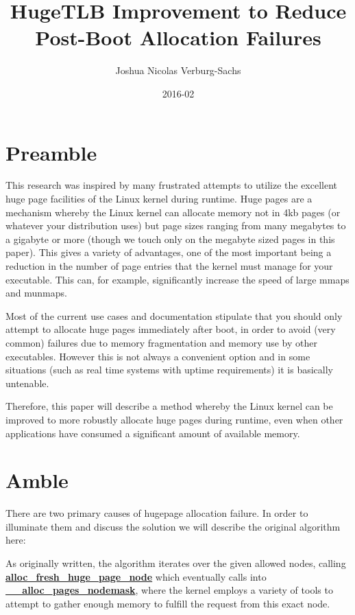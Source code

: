 \documentclass{article}
\title{HugeTLB Improvement to Reduce Post-Boot Allocation Failures}
\date{2016-02}
\author{Joshua Nicolas Verburg-Sachs}
\begin{document}
	\maketitle
	\newpage
	\tableofcontents
	\newpage

	\section{Preamble}
		This research was inspired by many frustrated attempts to utilize the excellent huge page facilities of the Linux kernel during runtime. Huge pages are a mechanism whereby the Linux kernel can allocate memory not in 4kb pages (or whatever your distribution uses) but page sizes ranging from many megabytes to a gigabyte or more (though we touch only on the megabyte sized pages in this paper). This gives a variety of advantages, one of the most important being a reduction in the number of page entries that the kernel must manage for your executable. This can, for example, significantly increase the speed of large mmaps and munmaps.

Most of the current use cases and documentation stipulate that you should only attempt to allocate huge pages immediately after boot, in order to avoid (very common) failures due to memory fragmentation and memory use by other executables. However this is not always a convenient option and in some situations (such as real time systems with uptime requirements) it is basically untenable.

Therefore, this paper will describe a method whereby the Linux kernel can be improved to more robustly allocate huge pages during runtime, even when other applications have consumed a significant amount of available memory.

\newpage
\section{Amble}
	There are two primary causes of hugepage allocation failure. In order to illuminate them and discuss the solution we will describe the original algorithm here:
\begin{figure}[h]

\label{figure:Original alloc_fresh_huge_page}
\end{figure}

As originally written, the algorithm iterates over the given allowed nodes, calling \href{http://lxr.free-electrons.com/source/mm/hugetlb.c?v=3.10#L693}{\textbf{alloc\_fresh\_huge\_page\_node}} which eventually calls into \href{http://lxr.free-electrons.com/source/mm/page_alloc.c?v=3.10#L2600}{\textbf{\_\_alloc\_pages\_nodemask}}, where the kernel employs a variety of tools to attempt to gather enough memory to fulfill the request from this exact node. 
\end{document}
